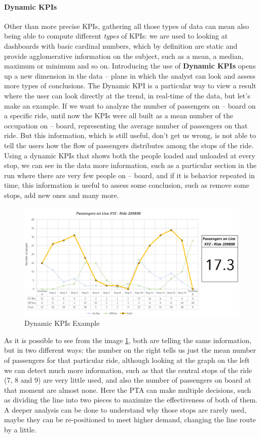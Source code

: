 \paragraph{Dynamic KPIs}
Other than more precise KPIs, gathering all those types of data can mean also being able to compute different \textit{types} of KPIs: we are used to looking at dashboards with basic cardinal numbers, which by definition are static and provide agglomerative information on the subject, such as a mean, a median, maximum or minimum and so on. 
Introducing the use of \textbf{Dynamic KPIs} opens up a new dimension in the data – plane in which the analyst can look and assess more types of conclusions. The Dynamic KPI is a particular way to view a result where the user can look directly at the trend, in real-time of the data, but let’s make an example.
If we want to analyze the number of passengers on – board on a specific ride, until now the KPIs were all built as a mean number of the occupation on – board, representing the average number of passengers on that ride. But this information, which is still useful, don’t get us wrong, is not able to tell the users how the flow of passengers distributes among the stops of the ride. Using a dynamic KPIs that shows both the people loaded and unloaded at every stop, we can see in the data more information, such as a particular section in the run where there are very few people on – board, and if it is behavior repeated in time, this information is useful to assess some conclusion, such as remove some stops, add new ones and many more.

\begin{figure}[t]
    \centering
    \includegraphics[width=1\textwidth]{Images/New Technologies/dynamic KPIs.png}
    \caption{Dynamic KPIs Example}
    \label{fig:dynKPI}
\end{figure}

\newpage As it is possible to see from the image  \ref{fig:dynKPI}, both are telling the same information, but in two different ways: the number on the right tells us just the mean number of passengers for that particular ride, although looking at the graph on the left we can detect much more information, such as that the central stops of the ride (7, 8 and 9) are very little used, and also the number of passengers on board at that moment are almost none. Here the PTA can make multiple decisions, such as dividing the line into two pieces to maximize the effectiveness of both of them. A deeper analysis can be done to understand why those stops are rarely used, maybe they can be re-positioned to meet higher demand, changing the line route by a little.

